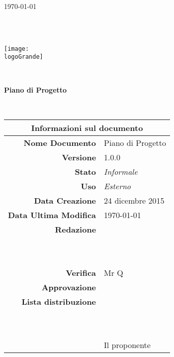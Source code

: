 \documentclass[12pt,a4paper]{article}
\title{\titoloDocumento}
\newcommand{\titoloDocumento}{Piano di Progetto}
\newcommand{\dataCreazione}{24 dicembre 2015}
\newcommand{\versione}{1.0.0}
\newcommand{\stato}{Informale}
\newcommand{\uso}{Esterno}
\begin{document}
\begin{titlepage}
\begin{center}
\today \\
\vspace{1cm}
\begin{Huge}
\textbf{\nomeGruppo} \\
\end{Huge}
\textbf{\prjL} \\
\vspace{1cm}
\texttt{[image: \\logoGrande]}
\vspace{1cm}

\HRule \\[0.4cm]
\begin{Huge}
{\huge \bfseries \titoloDocumento}\\[0.4cm]
\end{Huge}
\HRule \\[1cm]
\vfill

\begin{table}[h]
\begin{center}
\begin{tabular}{r | l}
\multicolumn{2}{c}{\textbf{Informazioni sul documento}}\\
\midrule
\textbf{Nome Documento}	&	\titoloDocumento	\\
\textbf{Versione}	&	\versione	\\
\textbf{Stato}	&	\emph{\stato}	\\
\textbf{Uso}	&	\emph{\uso}	\\
\textbf{Data Creazione}	&	\dataCreazione	\\
\textbf{Data Ultima Modifica}	&	\today	\\
\textbf{Redazione}	& \NDC \\
\ 	& \TP \\
\ 	& \IB \\
\textbf{Verifica}	&	Mr Q	\\
\textbf{Approvazione}	& \NDC \\
\textbf{Lista distribuzione}	&	\nomeGruppo	\\
\ 	&	\Vardanega	\\
\ 	&	\Cardin	\\
\ 	&	Il proponente \Zucchetti	\\

\end{tabular}
\end{center}
\end{table}

\end{center}
\end{titlepage}
\newpage
\end{document}
